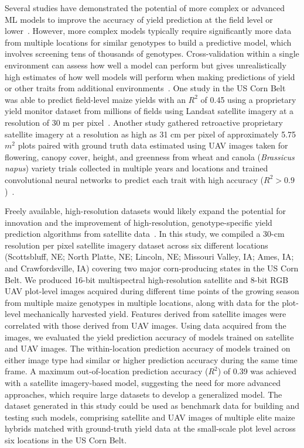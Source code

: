 \documentclass[12pt,twoside]{gsag3jnl}
\begin{document}
Several studies have demonstrated the potential of more complex or advanced ML models to improve the accuracy of yield prediction at the field level or lower~\citep{johnson2016crop, schwalbert2020satellite, victor2024high}. However, more complex models typically require significantly more data from multiple locations for similar genotypes to build a predictive model, which involves screening tens of thousands of genotypes. Cross-validation within a single environment can assess how well a model can perform but gives unrealistically high estimates of how well models will perform when making predictions of yield or other traits from additional environments~\citep{di2016overview}. One study in the US Corn Belt was able to predict field-level maize yields with an $R^2$ of 0.45 using a proprietary yield monitor dataset from millions of fields using Landsat satellite imagery at a resolution of 30 m per pixel~\citep{US_sat_cornbelt}. Another study gathered retroactive proprietary satellite imagery at a resolution as high as 31 cm per pixel of approximately 5.75 $m^2$ plots paired with ground truth data estimated using UAV images taken for flowering, canopy cover, height, and greenness from wheat and canola (\textit{Brassicus napus}) variety trials collected in multiple years and locations and trained convolutional neural networks to predict each trait with high accuracy ($R^2 > 0.9$)~\citep{victor2024high}. 

Freely available, high-resolution datasets would likely expand the potential for innovation and the improvement of high-resolution, genotype-specific yield prediction algorithms from satellite data~\citep{yang2009evaluating, US_sat_cornbelt}. In this study, we compiled a 30-cm resolution per pixel satellite imagery dataset across six different locations (Scottsbluff, NE; North Platte, NE; Lincoln, NE; Missouri Valley, IA; Ames, IA; and Crawfordsville, IA) covering two major corn-producing states in the US Corn Belt. We produced 16-bit multispectral high-resolution satellite and 8-bit RGB UAV plot-level images acquired during different time points of the growing season from multiple maize genotypes in multiple locations, along with data for the plot-level mechanically harvested yield. Features derived from satellite images were correlated with those derived from UAV images. Using data acquired from the images, we evaluated the yield prediction accuracy of models trained on satellite and UAV images. The within-location prediction accuracy of models trained on either image type had similar or higher prediction accuracy during the same time frame. A maximum out-of-location prediction accuracy ($R^2$) of 0.39 was achieved with a satellite imagery-based model, suggesting the need for more advanced approaches, which require large datasets to develop a generalized model. The dataset generated in this study could be used as benchmark data for building and testing such models, comprising satellite and UAV images of multiple elite maize hybrids matched with ground-truth yield data at the small-scale plot level across six locations in the US Corn Belt. 
\end{document}
